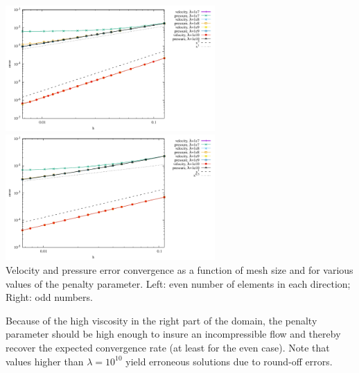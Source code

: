 \begin{center}
\includegraphics[width=8cm]{python_codes/fieldstone_05/results/errors_even.pdf}
\includegraphics[width=8cm]{python_codes/fieldstone_05/results/errors_odd.pdf}\\
{\captionfont Velocity and pressure error convergence as a function of mesh size and for various values
of the penalty parameter. Left: even number of elements in each direction; Right: odd numbers.
}
\end{center}

Because of the high viscosity in the right part of the domain, the penalty parameter should 
be high enough to insure an incompressible flow and thereby recover the expected convergence rate
(at least for the even case). Note that values higher than $\lambda=10^{10}$ yield erroneous solutions 
due to round-off errors. 

